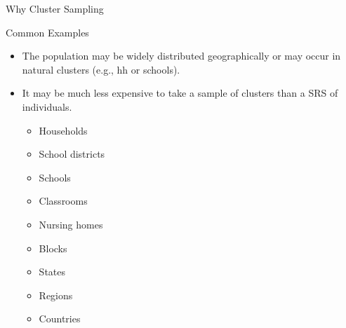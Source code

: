 \documentclass[10pt]{beamer}\usepackage[]{graphicx}\usepackage[]{xcolor}
\begin{document}
\begin{frame}{Why Cluster Sampling}
\begin{block}{Common Examples}
\begin{itemize}
\item The population may be widely distributed geographically or may occur in natural clusters (e.g., hh or schools).
\item It may be much less expensive to take a sample of clusters than a SRS of individuals. 
\begin{itemize}
\item Households
\item School districts
\item Schools
\item Classrooms
\item Nursing homes
\item Blocks
\item States
\item Regions
\item Countries
\end{itemize}
\end{itemize}
\end{block}
\end{frame}
\end{document}
